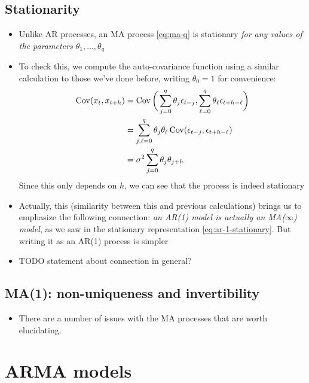 \documentclass{article}
\begin{document}
\subsection{Stationarity}

\begin{itemize}
\item Unlike AR processes, an MA process \eqref{eq:ma-q} is stationary \emph{for
    any values of the parameters $\theta_1,\dots,\theta_q$}

\item To check this, we compute the auto-covariance function using a similar
  calculation to those we've done before, writing $\theta_0 = 1$ for
  convenience:  
    \begin{align*}
  \operatorname{Cov}(x_t, x_{t+h}) &= \operatorname{Cov}\bigg( \sum_{j=0}^q \theta_j \epsilon_{t-j}, 
  \sum_{\ell=0}^q \theta_\ell \epsilon_{t+h-\ell} \bigg) \\
  &= \sum_{j,\ell=0}^q \theta_j \theta_\ell \operatorname{Cov}( \epsilon_{t-j},
    \epsilon_{t+h-\ell} ) \\
  &= \sigma^2 \sum_{j=0}^q \theta_j \theta_{j+h}
  \end{align*}
  Since this only depends on $h$, we can see that the process is indeed
  stationary 

\item Actually, this (similarity between this and previous calculations) brings
  us to emphasize the following connection: \emph{an AR(1) model is actually an
    MA($\infty$) model}, as we saw in the stationary representation
  \eqref{eq:ar-1-stationary}. But writing it as an AR(1) process is simpler 

\item TODO statement about connection in general?
\end{itemize}

\subsection{MA(1): non-uniqueness and invertibility}

\begin{itemize}
\item There are a number of issues with the MA processes that are worth
  elucidating. 
\end{itemize}

\section{ARMA models}
\end{document}
